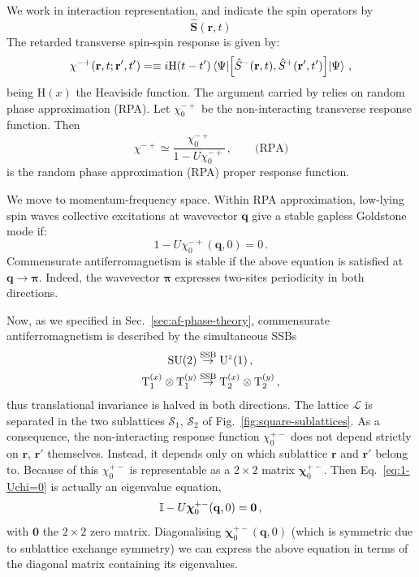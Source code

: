 We work in interaction representation, and indicate the spin operators by
\[
	\hat{\mathbf{S}}(\mathbf{r},t)
\]
The retarded transverse spin-spin response is given by:
\[
	\chi^{-+}(\mathbf{r},t;\mathbf{r}',t') =\equiv i \mathrm{H}(t-t') \mel{\Psi}{\comm{\hat S^-(\mathbf{r},t)}{\hat S^+(\mathbf{r}',t')}}{\Psi} \, ,
\]
being $\mathrm{H}(x)$ the Heaviside function. The argument carried by \citeauthor{singh1990collective} relies on random phase approximation (RPA). Let $\chi_0^{-+}$ be the non-interacting transverse response function. Then
\[
	\chi^{-+} \simeq \frac{\chi_0^{-+}}{1-U\chi_0^{-+}} \, ,
	\qquad
	\text{(RPA)}
\]
is the random phase approximation (RPA) proper response function.

We move to momentum-frequency space. Within RPA approximation, low-lying spin waves collective excitations at wavevector $\mathbf{q}$ give a stable gapless Goldstone mode if:
\begin{equation}\label{eq:1-Uchi=0}
	1-U\chi_0^{-+}(\mathbf{q},0) = 0 \, .
\end{equation}
Commensurate antiferromagnetism is stable if the above equation is satisfied at $\mathbf{q}\to\bm{\pi}$. Indeed, the wavevector $\bm{\pi}$ expresses two-sites periodicity in both directions.

Now, as we specified in Sec.~\ref{sec:af-phase-theory}, commensurate antiferromagnetism is described by the simultaneous SSBs
\[
\begin{aligned}
	\mathrm{SU}(2) &\stackrel{\mathrm{SSB}}{\to} \mathrm{U}^z(1) \, , \\
	\mathrm{T}_1^{(x)} \otimes \mathrm{T}_1^{(y)} &\stackrel{\mathrm{SSB}}{\to} \mathrm{T}_2^{(x)} \otimes \mathrm{T}_2^{(y)} \, ,
\end{aligned}
\]
thus translational invariance is halved in both directions. The lattice $\mathcal{L}$ is separated in the two sublattices $\mathcal{S}_1$, $\mathcal{S}_2$ of Fig.~\ref{fig:square-sublattices}. As a consequence, the non-interacting response function $\chi_0^{+-}$ does not depend strictly on $\mathbf{r}$, $\mathbf{r}'$ themselves. Instead, it depends only on which sublattice $\mathbf{r}$ and $\mathbf{r}'$ belong to. Because of this $\chi_0^{+-}$ is representable as a $2 \times 2$ matrix $\bm{\chi}_0^{+-}$. Then Eq.~\eqref{eq:1-Uchi=0} is actually an eigenvalue equation,
\[
	\mathbb{I} - U \bm{\chi}_0^{+-}(\mathbf{q},0) = \bm{0} \, ,
\]
with $\bm{0}$ the $2\times2$ zero matrix. Diagonalising $\bm{\chi}_0^{+-}(\mathbf{q},0)$ (which is symmetric due to sublattice exchange symmetry) we can express the above equation in terms of the diagonal matrix containing its eigenvalues.

